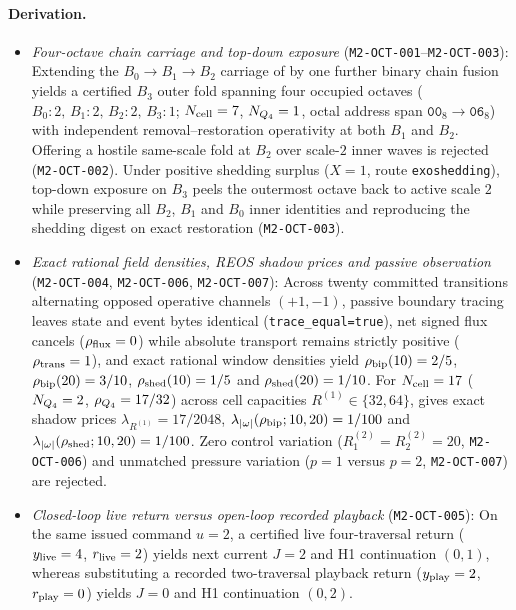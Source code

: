 \paragraph{Derivation.}
\begin{itemize}
 \item \emph{Four-octave chain carriage and top-down exposure}
 (\texttt{M2-OCT-001}--\texttt{M2-OCT-003}): Extending the \(B_0\to B_1\to B_2\)
 carriage of  by one further binary chain fusion yields
 a certified \(B_3\) outer fold spanning four occupied octaves
 (\(B_0:2,\,B_1:2,\,B_2:2,\,B_3:1\); \(N_{\rm cell}=7\), \(N_{Q_4}=1\),
 octal address span \(\mathtt{00}_8\to\mathtt{06}_8\)) with independent
 removal--restoration operativity at both \(B_1\) and \(B_2\). Offering a
 hostile same-scale fold at \(B_2\) over scale-\(2\) inner waves is rejected
 (\texttt{M2-OCT-002}). Under positive shedding surplus (\(X=1\), route
 \texttt{exoshedding}), top-down exposure on \(B_3\) peels the outermost octave
 back to active scale \(2\) while preserving all \(B_2\), \(B_1\) and \(B_0\)
 inner identities and reproducing the shedding digest on exact restoration
 (\texttt{M2-OCT-003}).
 \item \emph{Exact rational field densities, REOS shadow prices and passive
 observation} (\texttt{M2-OCT-004}, \texttt{M2-OCT-006}, \texttt{M2-OCT-007}):
 Across twenty committed transitions alternating opposed operative channels
 \((+1,-1)\), passive boundary tracing leaves state and event bytes identical
 (\texttt{trace\_equal=true}), net signed flux cancels
 (\(\rho_{\rm flux}=0\)) while absolute transport remains strictly positive
 (\(\rho_{\rm trans}=1\)), and exact rational window densities yield
 \(\rho_{\rm bip}(10)=2/5\), \(\rho_{\rm bip}(20)=3/10\),
 \(\rho_{\rm shed}(10)=1/5\) and \(\rho_{\rm shed}(20)=1/10\). For
 \(N_{\rm cell}=17\) (\(N_{Q_4}=2\), \(\rho_{Q_4}=17/32\)) across cell
 capacities \(R^{(1)}\in\{32,64\}\), 
 gives exact shadow prices \(\lambda_{R^{(1)}}=17/2048\),
 \(\lambda_{|\omega|}(\rho_{\rm bip};10,20)=1/100\) and
 \(\lambda_{|\omega|}(\rho_{\rm shed};10,20)=1/100\). Zero control variation
 (\(R^{(2)}_1=R^{(2)}_2=20\), \texttt{M2-OCT-006}) and unmatched pressure
 variation (\(p=1\) versus \(p=2\), \texttt{M2-OCT-007}) are rejected.
 \item \emph{Closed-loop live return versus open-loop recorded playback}
 (\texttt{M2-OCT-005}): On the same issued command \(u=2\), a certified live
 four-traversal return (\(y_{\rm live}=4\), \(r_{\rm live}=2\)) yields next
 current \(J=2\) and H1 continuation \((0,1)\), whereas substituting a recorded
 two-traversal playback return (\(y_{\rm play}=2\), \(r_{\rm play}=0\)) yields
 \(J=0\) and H1 continuation \((0,2)\).
\end{itemize}

